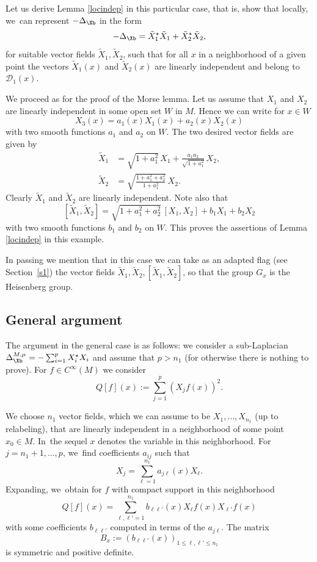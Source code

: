 Let us derive Lemma \ref{locindep} in this particular case, that is, show that locally, we~can represent $-\Delta_\Xb$ in the form
\[
- \Delta_\Xb = \tilde X_1^\star \tilde X_1 + \tilde X_2^\star \tilde X_2,
\]
for suitable vector fields $\tilde X_1,\tilde X_2$, such that for all $x$ in a neighborhood of a given point the vectors $\tilde X_1(x)$ and $\tilde X_2(x)$ are linearly independent and belong to $\mathcal D_1(x)$.

We proceed as for the proof of the Morse lemma. Let us assume that $X_1$ and $X_2$ are linearly independent in some open set $W$ in $M$. Hence we can write for $x\in W$
\[
X_3(x) = a_1(x) X_1(x) + a_2(x) X_2(x)
\]
with two smooth functions $a_1$ and $a_2$ on $W$. The two desired vector fields are given by
\begin{equation}
\begin{array}{ll}
\tilde X_1 &= \sqrt{1+a_1^2} \,X_1 + \frac{a_1 a_2}{\sqrt{1+ a_1^2}} \,X_2, \\
\tilde X_2 &= \sqrt{\frac{1+ a_1^2 + a_2^2}{1+a_1^2}} \,X_2.
\end{array}
\end{equation}
Clearly $\tilde X_1$ and $\tilde X_2$ are linearly independent. Note also that
\[
[\tilde X_1,\tilde X_2] = \sqrt{1+a_1^2 +a_2^2}\,[X_1,X_2] + b_1 X_1 + b_2 X_2
\]
with two smooth functions $b_1$ and $b_2$ on $W$. This proves the assertions of Lemma \ref{locindep} in this example.

In passing we mention that in this case we can take as an adapted flag (see Section~\ref{s1}) the vector fields $\tilde X_1, \tilde X_2, [\tilde X_1,\tilde X_2] $, so that the group $G_x$ is the Heisenberg group.

\subsection{General argument}
The argument in the general case is as follows: we consider a sub-Laplacian $\Delta_\Xb^{M,\mu} =-\sum_{i=1}^p X_i^\star X_i$ and assume that $p>n_1$ (for otherwise there is nothing to prove). For $f\in C^\infty(M)$ we consider
\[
Q[f](x) := \sum_{j=1}^p (X_j f (x))^2.
\]

We choose $n_1$ vector fields, which we can assume to be $X_1,\ldots,X_{n_1}$ (up to relabeling), that are linearly independent in a neighborhood of some point $x_0\in M$. In~the sequel $x$ denotes the variable in this neighborhood. For $j=n_1+1,\ldots,p$, we~find coefficients $a_{ij}$ such that
\[
X_j=\sum_{\ell=1}^{n_1} a_{j\ell}(x)X_\ell.
\]
Expanding, we~obtain for $f$ with compact support in this neighborhood
\[
Q[f](x)=\sum_{\ell, \ell'=1}^{n_1} b_{\ell \ell'}(x)X_\ell f(x) X_{\ell'}f(x)
\]
with some coefficients $b_{\ell \ell'}$ computed in terms of the $a_{j\ell}$. The matrix
\[
B_x :=(b_{\ell \ell'}(x))_{1\leq \ell,\ell'\leq n_1}
\]
is symmetric and positive definite.

